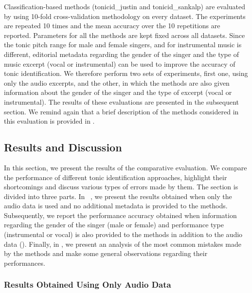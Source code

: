 Classification-based methods (\acrshort{tonicid_justin} and \acrshort{tonicid_sankalp}) are evaluated by using 10-fold cross-validation methodology on every dataset. The experiments are repeated 10 times and the mean accuracy over the 10 repetitions are reported. Parameters for all the methods are kept fixed across all datasets. Since the tonic pitch range for male and female singers, and for instrumental music is different, editorial metadata regarding the gender of the singer and the type of music excerpt (vocal or instrumental) can be used to improve the accuracy of tonic identification. We therefore perform two sets of experiments, first one, using only the audio excerpts, and the other, in which the methods are also given information about the gender of the singer and the type of excerpt (vocal or instrumental). The results of these evaluations are presented in the subsequent section. We remind again that a brief description of the methods considered in this evaluation is provided in .


\subsection{Results and Discussion}
\label{sec:pre_processing_tonic_identification_results}

In this section, we present the results of the comparative evaluation. We compare the performance of different tonic identification approaches, highlight their shortcomings and discuss various types of errors made by them. The section is divided into three parts. In ~, we present the results obtained when only the audio data is used and no additional metadata is provided to the methods. Subsequently, we report the performance accuracy
obtained when information regarding the gender of the singer (male or female) and performance type (instrumental or vocal) is also provided to the methods in addition to the audio data (). Finally, in , we present an analysis of the most common mistakes made by the methods and make some general observations regarding their performances.


\subsubsection{Results Obtained Using Only Audio Data}
\label{sec:pre_processing_tonic_id_results_only_audio_data}


